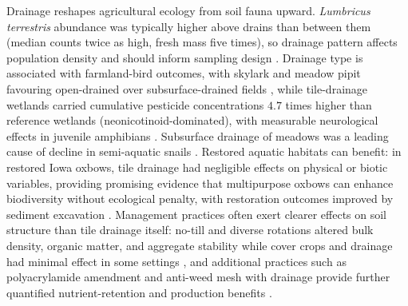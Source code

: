 \documentclass[11pt]{article}
\begin{document}
Drainage reshapes agricultural ecology from soil fauna upward. \textit{Lumbricus
terrestris} abundance was typically higher above drains than between them
(median counts twice as high, fresh mass five times), so drainage pattern
affects population density and should inform sampling design
\parencite{Nuutinen2001,Nuutinen2011}. Drainage type is associated with
farmland-bird outcomes, with skylark and meadow pipit favouring open-drained
over subsurface-drained fields \parencite{Marja2013}, while tile-drainage
wetlands carried cumulative pesticide concentrations $4.7$ times higher than
reference wetlands (neonicotinoid-dominated), with measurable neurological
effects in juvenile amphibians \parencite{Campbell2023}. Subsurface drainage
of meadows was a leading cause of decline in semi-aquatic snails
\parencite{Dreyfuss2018}. Restored aquatic habitats can benefit: in restored
Iowa oxbows, tile drainage had negligible effects on physical or biotic
variables, providing promising evidence that multipurpose oxbows can enhance
biodiversity without ecological penalty, with restoration outcomes improved by
sediment excavation \parencite{Leberg2024,Winikoff2020,Harris2018}. Management
practices often exert clearer effects on soil structure than tile drainage
itself: no-till and diverse rotations altered bulk density, organic matter, and
aggregate stability while cover crops and drainage had minimal effect in some
settings \parencite{Saha2024,Hermawan1996,Sherbine2023}, and additional
practices such as polyacrylamide amendment and anti-weed mesh with drainage
provide further quantified nutrient-retention and production benefits
\parencite{Jiang2010,GiménezValero2024,GiménezValero2025}.

\printbibliography
\end{document}
